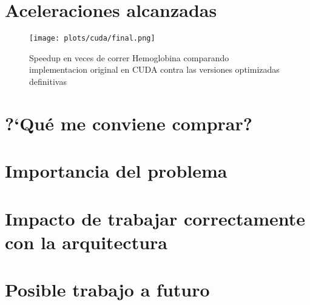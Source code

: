 \section{Aceleraciones alcanzadas}

\begin{figure}[htbp]
   \centering
   \texttt{[image: plots/cuda/final.png]}
   \caption{Speedup en veces de correr Hemoglobina comparando implementacion original en CUDA contra
   las versiones optimizadas definitivas}
   \label{plt:cuda-final}
\end{figure}


\section{?`Qu\'e me conviene comprar?}


\section{Importancia del problema}
\section{Impacto de trabajar correctamente con la arquitectura}
\section{Posible trabajo a futuro}
